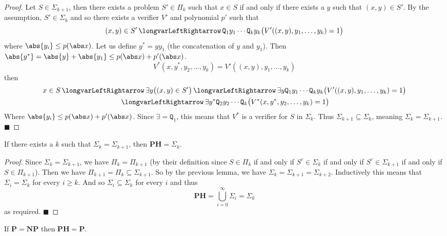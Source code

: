 \documentclass[10pt]{article}
\def\iff{\,\longvarLeftRightarrow\,}
\def\quant{\mathtt{Q}}
\def\PH{\mathbf{PH}}
\def\P{\mathbf{P}}
\def\NP{\mathbf{NP}}
\def\qed{%
    \ifmmode%
        \eqno\blacksquare%
    \else%
        \hskip1cm\allowbreak\hbox{}\nobreak\hfill$\blacksquare$%
    \fi%
}
\begin{document}
\begin{proof}

    Let $S\in\Sigma_{k+1}$, then there exists a problem $S'\in\Pi_k$ such that $x\in S$ if and only if there exists a $y$ such that $(x,y)\in S'$.
    By the assumption, $S'\in\Sigma_k$ and so there exists a verifier $V'$ and polynomial $p'$ such that
    \[ (x,y)\in S'\iff \quant_1y_1\cdots\quant_ky_k\bigl(V'((x,y),y_1,\dots,y_k)=1\bigr) \]
    where $\abs{y_i}\leq p(\abs x)$.
    Let us define $y^*=yy_1$ (the concatenation of $y$ and $y_1$).
    Then $\abs{y^*}=\abs{y}+\abs{y_1}\leq p(\abs x)+p'(\abs x)$.
    \[ V^*(x,y^*,y_2,\dots,y_k) = V'((x,y),y_1,\dots,y_k) \]
    then
    \begin{multline*}
        x\in S\iff \exists y\bigl((x,y)\in S'\bigr) \iff \exists y\quant_1y_1\cdots\quant_ky_k\bigl(V'((x,y),y_1,\dots,y_k)=1\bigr) \\
        \iff \exists y^*\quant_2 y_2\cdots\quant_k\bigl(V^*(x,y^*,y_2,\dots,y_k)=1\bigr)
    \end{multline*}
    Where $\abs{y_i}\leq p(\abs x)+p'(\abs x)$.
    Since $\exists=\quant_1$, this means that $V^*$ is a verifier for $S$ in $\Sigma_k$.
    Thus $\Sigma_{k+1}\subseteq\Sigma_k$, meaning $\Sigma_k=\Sigma_{k+1}$.
    \qed

\end{proof}

\begin{thrm*}

    If there exists a $k$ such that $\Sigma_k=\Sigma_{k+1}$, then $\PH=\Sigma_k$.

\end{thrm*}

\begin{proof}

    Since $\Sigma_k=\Sigma_{k+1}$, we have $\Pi_k=\Pi_{k+1}$ (by their definition since $S\in\Pi_k$ if and only if $S^c\in\Sigma_k$ if and only if $S^c\in\Sigma_{k+1}$ if and only if $S\in\Pi_{k+1}$).
    Then we have $\Pi_{k+1}=\Pi_k\subseteq\Sigma_{k+1}$.
    So by the previous lemma, we have $\Sigma_k=\Sigma_{k+1}=\Sigma_{k+2}$.
    Inductively this means that $\Sigma_i=\Sigma_k$ for every $i\geq k$.
    And so $\Sigma_i\subseteq\Sigma_k$ for every $i$ and thus
    \[ \PH = \bigcup_{i=0}^\infty \Sigma_i = \Sigma_k \]
    as required.
    \qed

\end{proof}

\begin{coro*}

    If $\P=\NP$ then $\PH=\P$.

\end{coro*}
\end{document}

